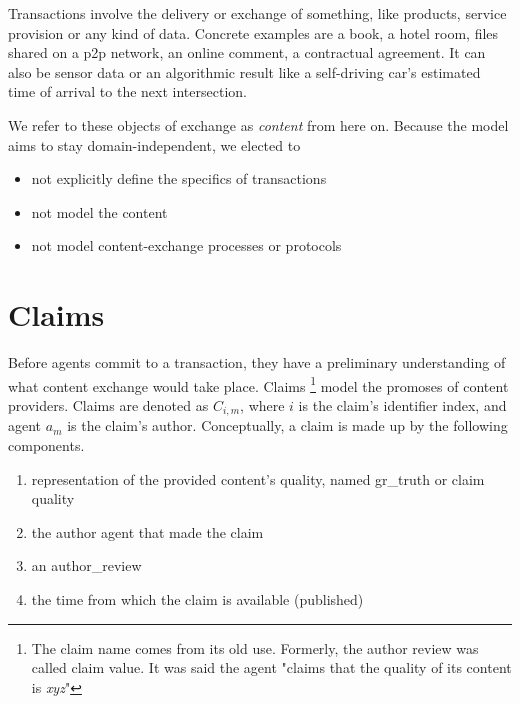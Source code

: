 \documentclass[%
    ]{\PathToTumTemplate/thesis/tum_thesis}
\begin{document}
Transactions involve the delivery or exchange of something, like products, service provision or any kind of data.
Concrete examples are a book, a hotel room, files shared on a \acrlong{p2p} network, an online comment, a contractual agreement.
It can also be sensor data or an algorithmic result like a self-driving car's estimated time of arrival to the next intersection.

We refer to these objects of exchange as \emph{content} from here on.
Because the model aims to stay domain-independent, we elected to 
\begin{itemize}
\item not explicitly define the specifics of transactions
\item not model the content
\item not model content-exchange processes or protocols
\end{itemize}



\section{Claims}\label{sec:approach_claims}

Before agents commit to a transaction, they have a preliminary understanding of what content exchange would take place.
Claims
\footnote{The claim name comes from its old use. Formerly, the author review was called claim value. It was said the agent "claims that the quality of its content is \emph{xyz}"}
model the promoses of content providers.
Claims are denoted as $ C_{i,m} $, where $i$ is the claim's identifier index, and agent $a_m$ is the claim's author.
Conceptually, a claim is made up by the following components.
\begin{enumerate}
	\item representation of the provided content's quality, named \gls{gr_truth} or claim quality
	\item the author agent that made the claim
	\item an \gls{author_review}
	\item the time from which the claim is available (published)
\end{enumerate}
\end{document}
